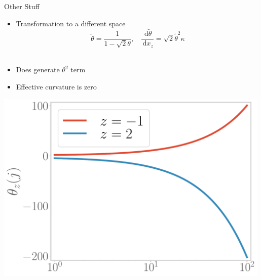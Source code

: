 \documentclass[11pt,aspectratio=169]{beamer}
\begin{document}
\begin{frame}{Other Stuff}

\begin{minipage}{0.5\textwidth}
\begin{itemize}
\item Transformation to a different space
	\[ \tilde\theta = \frac{1}{1 - \sqrt 2 \theta}, ~ ~ ~ ~\frac{\:\mathrm{d}\tilde\theta}{\:\mathrm{d}x_z} = \sqrt 2 \tilde\theta^2 \kappa \]\\[5pt]
\item Does generate \(\theta^2\) term\\[10pt]
\item Effective curvature is zero
\end{itemize}
\end{minipage}
\begin{minipage}{0.49\textwidth}
\includegraphics[width=0.99\textwidth]{figures/thetap.pdf}
\end{minipage}
\end{frame}
\end{document}

